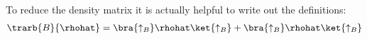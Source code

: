 To reduce the density matrix it is actually helpful to write out the definitions:
\begin{align}
\trarb{B}{\rhohat} = \bra{\uparrow_B}\rhohat\ket{\uparrow_B}+\bra{\uparrow_B}\rhohat\ket{\uparrow_B}
\end{align}